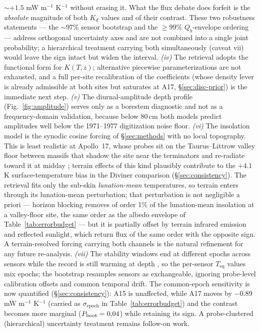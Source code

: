 \documentclass[11pt]{article}
\newcommand{\zborestem}{80\,\si{\centi\meter}}
\begin{document}
$\sim$$+1.5$ mW m$^{-1}$ K$^{-1}$ without erasing it. What the flux
debate does forfeit is the \emph{absolute} magnitude of both $K_d$
values and of their contrast. These two robustness statements ---
the $\sim$97\% sensor bootstrap and the $\ge$99\% $Q_b$-envelope
ordering --- address orthogonal uncertainty axes and are not combined
into a single joint probability; a hierarchical treatment carrying
both simultaneously (caveat vii) would leave the sign intact but widen
the interval. \emph{(iv)} The
retrieval adopts the
\citet{hayne2017} functional form for $K(T,z)$; alternative piecewise
parameterizations are not exhausted, and a full per-site
recalibration of
the \citet{martinez2021} coefficients (whose density lever is already
admissible at both sites but saturates at A17,
\S\ref{sec:disc-prior}) is the immediate next step. \emph{(v)} The
diurnal-amplitude depth profile (Fig.~\ref{fig:amplitude}) serves only as a
borestem diagnostic and not as a frequency-domain validation, because below
$\zborestem$ both models predict amplitudes well below the 1971--1977
digitization noise floor. \emph{(vi)} The insolation model is the
synodic cosine forcing of \S\ref{sec:methods} with no local topography.
This is least realistic at Apollo~17, whose probes sit on the
Taurus--Littrow valley floor between massifs that shadow the site near
the terminators and re-radiate toward it at midday
\citep{langseth1976}; terrain effects of this kind plausibly contribute
to the $+4.1$ K surface-temperature bias in the Diviner comparison
(\S\ref{sec:consistency}). The retrieval fits only the
sub-skin \emph{lunation-mean} temperatures, so terrain enters through its
lunation-mean perturbation; that perturbation is not negligible a
priori --- horizon blocking removes of order 1\% of the lunation-mean
insolation at a valley-floor site, the same order as the albedo
envelope of Table~\ref{tab:errorbudget} --- but it is partially offset
by terrain infrared emission and reflected sunlight, which return flux
of the same order with the opposite sign. A terrain-resolved forcing
carrying both channels is the natural refinement for any future
re-analysis. \emph{(vii)} The stability windows end at different
epochs across sensors while the record is still warming at depth
\citep{nagihara2018}, so the per-sensor $T_\mathrm{eq}$ values mix
epochs; the bootstrap resamples sensors as exchangeable, ignoring
probe-level calibration offsets and common temporal drift. The
common-epoch sensitivity is now quantified
(\S\ref{sec:consistency}): A15 is unaffected, while A17 moves by
$-0.89$ mW m$^{-1}$ K$^{-1}$ (carried as $\sigma_\mathrm{epoch}$ in
Table~\ref{tab:errorbudget}) and the contrast becomes more marginal
($P_{\rm boot}=0.04$) while retaining its sign. A probe-clustered
(hierarchical) uncertainty treatment remains follow-on work.
\end{document}
